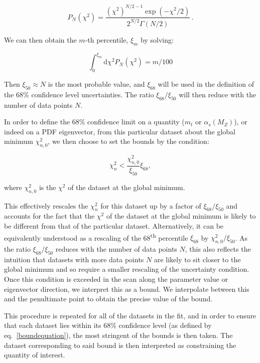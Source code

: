 \documentclass[sn-mathphys]{sn-jnl}%
\newcommand{\as}{\alpha_s(M_Z)}
\begin{document}
\begin{equation}
    P_N(\chi^2) = \frac{(\chi^2)^{N/2-1}\exp{(-\chi^2/2)}}{2^{N/2}\Gamma(N/2)}\,.
\end{equation}

We can then obtain the $m$-th percentile, $\xi_m$ by solving:

\begin{equation}
    \int_0^{\xi_m} \mathrm{d}\chi^2 P_N (\chi^2) = m/100
\end{equation}

Then $\xi_{50} \approx N$ is the most probable value, and $\xi_{68}$  will be used in the definition of the 68\% confidence level uncertainties. The ratio $\xi_{68}/\xi_{50}$ will then reduce with the number of data points $N$.

In order to define the 68\% confidence limit on a quantity ($m_t$ or $\as$), or indeed on a PDF eigenvector, from this particular dataset about the global minimum $\chi^2_{n,0}$, we then choose to set the bounds by the condition:

\begin{equation} \label{boundequation}
    \chi_n^2 \lt \frac{\chi^2_{n,0}}{\xi_{50}}\xi_{68},
\end{equation}

where $\chi^2_{n,0}$ is the $\chi^2$ of the dataset at the global minimum.

This effectively rescales the $\chi^2_n$ for this dataset up by a factor of $\xi_{68}/\xi_{50}$ and accounts for the fact that the $\chi^2$ of the dataset at the global minimum is likely to be different from that of the particular dataset. Alternatively, it can be equivalently understood as a rescaling of the 68\textsuperscript{th} percentile $\xi_{68}$ by $\chi^2_{n,0}/\xi_{50}$. As the ratio $\xi_{68}/\xi_{50}$ reduces with the number of data points $N$, this also reflects the intuition that datasets with more data points $N$ are likely to sit closer to the global minimum and so require a smaller rescaling of the uncertainty condition. Once this condition is exceeded in the scan along the parameter value or eigenvector direction, we interpret this as a bound. We interpolate between this and the penultimate point to obtain the precise value of the bound.

This procedure is repeated for all of the datasets in the fit, and in order to ensure that each dataset lies within its 68\% confidence level (as defined by eq.~\ref{boundequation}), the most stringent of the bounds is then taken. The dataset corresponding to said bound is then interpreted as constraining the quantity of interest.
\end{document}

